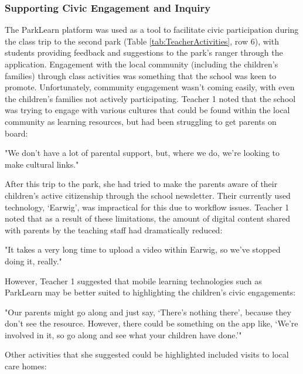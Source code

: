 \subsubsection{Supporting Civic Engagement and Inquiry}

The ParkLearn platform was used as a tool to facilitate civic participation during the class trip to the second park (Table \ref{tab:TeacherActivities}, row 6), with students providing feedback and suggestions to the park's ranger through the application. Engagement with the local community (including the children's families) through class activities was something that the school was keen to promote. Unfortunately, community engagement wasn't coming easily, with even the children's families not actively participating. Teacher 1 noted that the school was trying to engage with various cultures that could be found within the local community as learning resources, but had been struggling to get parents on board: 

\begin{displayquote}
"We don’t have a lot of parental support, but, where we do, we’re looking to make cultural links."
\end{displayquote}

After this trip to the park, she had tried to make the parents aware of their children’s active citizenship through the school newsletter. Their currently used technology, `Earwig', was impractical for this due to workflow issues. Teacher 1 noted that as a result of these limitations, the amount of digital content shared with parents by the teaching staff had dramatically reduced:

\begin{displayquote}
"It takes a very long time to upload a video within Earwig, so we've stopped doing it, really."
\end{displayquote}

However, Teacher 1 suggested that mobile learning technologies such as ParkLearn may be better suited to highlighting the children’s civic engagements: 

\begin{displayquote}
"Our parents might go along and just say, `There's nothing there', because they don’t see the resource. However, there could be something on the app like, `We're involved in it, so go along and see what your children have done.'" 
\end{displayquote}

Other activities that she suggested could be highlighted included visits to local care homes: 

